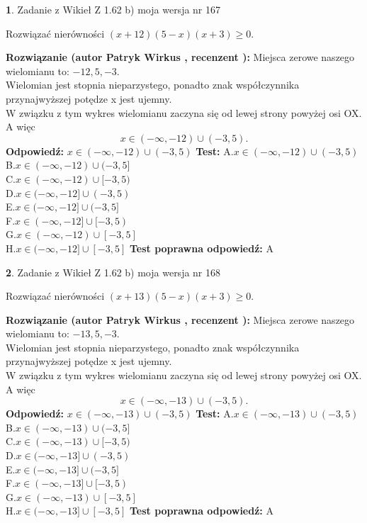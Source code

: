 \documentclass[12pt, a4paper]{article}
\theoremstyle{definition} %
\newtheorem{zad}{}
\newcommand{\zadStart}[1]{\begin{zad}#1\newline}
\newcommand{\zadStop}{\end{zad}}
\newcommand{\rozwStart}[2]{\noindent \textbf{Rozwiązanie (autor #1 , recenzent #2): }\newline}
\newcommand{\rozwStop}{\newline}
\newcommand{\odpStart}{\noindent \textbf{Odpowiedź:}\newline}
\newcommand{\odpStop}{\newline}
\newcommand{\testStart}{\noindent \textbf{Test:}\newline}
\newcommand{\testStop}{\newline}
\newcommand{\kluczStart}{\noindent \textbf{Test poprawna odpowiedź:}\newline}
\newcommand{\kluczStop}{\newline}
\begin{document}
\zadStart{Zadanie z Wikieł Z 1.62 b) moja wersja nr 167}

Rozwiązać nierówności $(x+12)(5-x)(x+3)\ge0$.
\zadStop
\rozwStart{Patryk Wirkus}{}
Miejsca zerowe naszego wielomianu to: $-12, 5, -3$.\\
Wielomian jest stopnia nieparzystego, ponadto znak współczynnika przy\linebreak najwyższej potędze x jest ujemny.\\ W związku z tym wykres wielomianu zaczyna się od lewej strony powyżej osi OX. A więc $$x \in (-\infty,-12) \cup (-3,5).$$
\rozwStop
\odpStart
$x \in (-\infty,-12) \cup (-3,5)$
\odpStop
\testStart
A.$x \in (-\infty,-12) \cup (-3,5)$\\
B.$x \in (-\infty,-12) \cup (-3,5]$\\
C.$x \in (-\infty,-12) \cup [-3,5)$\\
D.$x \in (-\infty,-12] \cup (-3,5)$\\
E.$x \in (-\infty,-12] \cup (-3,5]$\\
F.$x \in (-\infty,-12] \cup [-3,5)$\\
G.$x \in (-\infty,-12) \cup [-3,5]$\\
H.$x \in (-\infty,-12] \cup [-3,5]$
\testStop
\kluczStart
A
\kluczStop



\zadStart{Zadanie z Wikieł Z 1.62 b) moja wersja nr 168}

Rozwiązać nierówności $(x+13)(5-x)(x+3)\ge0$.
\zadStop
\rozwStart{Patryk Wirkus}{}
Miejsca zerowe naszego wielomianu to: $-13, 5, -3$.\\
Wielomian jest stopnia nieparzystego, ponadto znak współczynnika przy\linebreak najwyższej potędze x jest ujemny.\\ W związku z tym wykres wielomianu zaczyna się od lewej strony powyżej osi OX. A więc $$x \in (-\infty,-13) \cup (-3,5).$$
\rozwStop
\odpStart
$x \in (-\infty,-13) \cup (-3,5)$
\odpStop
\testStart
A.$x \in (-\infty,-13) \cup (-3,5)$\\
B.$x \in (-\infty,-13) \cup (-3,5]$\\
C.$x \in (-\infty,-13) \cup [-3,5)$\\
D.$x \in (-\infty,-13] \cup (-3,5)$\\
E.$x \in (-\infty,-13] \cup (-3,5]$\\
F.$x \in (-\infty,-13] \cup [-3,5)$\\
G.$x \in (-\infty,-13) \cup [-3,5]$\\
H.$x \in (-\infty,-13] \cup [-3,5]$
\testStop
\kluczStart
A
\kluczStop
\end{document}
